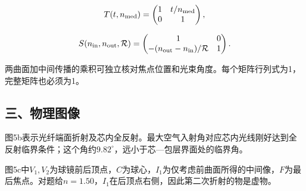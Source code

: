 \documentclass[12pt,a4paper,fontset=fandol]{ctexart}
\begin{document}
\[
T(t,n_{\rm med})=
\begin{pmatrix}1&t/n_{\rm med}\\0&1\end{pmatrix},
\]

\[
S(n_{\rm in},n_{\rm out},\mathcal R)=
\begin{pmatrix}
1&0\\
-(n_{\rm out}-n_{\rm in})/\mathcal R&1
\end{pmatrix}.
\]

两曲面加中间传播的乘积可独立核对焦点位置和光束角度。每个矩阵行列式为1，完整矩阵也必须为1。

\subsection{三、物理图像}\label{ux4e09ux7269ux7406ux56feux50cf-4}

图5b表示光纤端面折射及芯内全反射。最大空气入射角对应芯内光线刚好达到全反射临界条件；这个角约\(9.82^\circ\)，远小于芯---包层界面处的临界角。

\begin{center}
\begin{minipage}{\linewidth}
\centering\begingroup{}
\ifdim\wd\diagrambox>.88\linewidth
\sbox{\diagrambox}{\resizebox{.88\linewidth}{!}{\usebox{\diagrambox}}}\fi
\ifdim\ht\diagrambox>.38\textheight
\resizebox{!}{.38\textheight}{\usebox{\diagrambox}}
\else\usebox{\diagrambox}\fi
\par{}\endgroup\end{minipage}\end{center}

图5c中\(V_1,V_2\)为球镜前后顶点，\(C\)为球心，\(I_1\)为仅考虑前曲面所得的中间像，\(F\)为最后焦点。对题给\(n=1.50\)，\(I_1\)在后顶点右侧，因此第二次折射的物是虚物。
\end{document}
